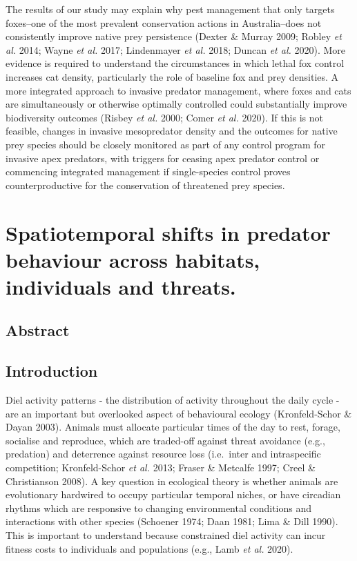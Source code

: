 \documentclass[11pt,a4paper,titlepage,twoside,openright]{style/unimelbthesis}
\begin{document}
\begin{mainmatter}
The results of our study may explain why pest management that only targets foxes--one of the most prevalent conservation actions in Australia--does not consistently improve native prey persistence (Dexter \& Murray 2009; Robley \emph{et al.} 2014; Wayne \emph{et al.} 2017; Lindenmayer \emph{et al.} 2018; Duncan \emph{et al.} 2020). More evidence is required to understand the circumstances in which lethal fox control increases cat density, particularly the role of baseline fox and prey densities. A more integrated approach to invasive predator management, where foxes and cats are simultaneously or otherwise optimally controlled could substantially improve biodiversity outcomes (Risbey \emph{et al.} 2000; Comer \emph{et al.} 2020). If this is not feasible, changes in invasive mesopredator density and the outcomes for native prey species should be closely monitored as part of any control program for invasive apex predators, with triggers for ceasing apex predator control or commencing integrated management if single-species control proves counterproductive for the conservation of threatened prey species.

\hypertarget{diel}{%
\chapter{Spatiotemporal shifts in predator behaviour across habitats, individuals and threats.}\label{diel}}

\hypertarget{abstract-3}{%
\section*{Abstract}\label{abstract-3}}

\newpage

\hypertarget{introduction-3}{%
\section{Introduction}\label{introduction-3}}

Diel activity patterns - the distribution of activity throughout the daily cycle - are an important but overlooked aspect of behavioural ecology (Kronfeld-Schor \& Dayan 2003). Animals must allocate particular times of the day to rest, forage, socialise and reproduce, which are traded-off against threat avoidance (e.g., predation) and deterrence against resource loss (i.e.~inter and intraspecific competition; Kronfeld-Schor \emph{et al.} 2013; Fraser \& Metcalfe 1997; Creel \& Christianson 2008). A key question in ecological theory is whether animals are evolutionary hardwired to occupy particular temporal niches, or have circadian rhythms which are responsive to changing environmental conditions and interactions with other species (Schoener 1974; Daan 1981; Lima \& Dill 1990). This is important to understand because constrained diel activity can incur fitness costs to individuals and populations (e.g., Lamb \emph{et al.} 2020).


\end{mainmatter}
\end{document}
